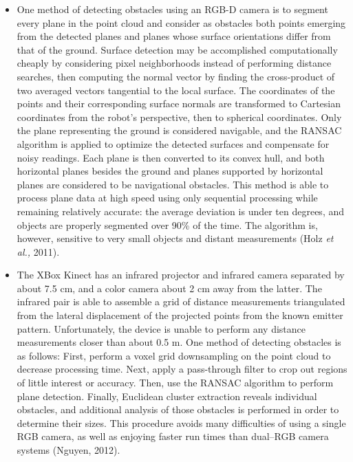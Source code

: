 \documentclass[12pt]{report}
\begin{document}
\begin{itemize}
\item{One method of detecting obstacles using an RGB-D camera is to segment every plane in the point cloud and consider as obstacles both points emerging from the detected planes and planes whose surface orientations differ from that of the ground.  Surface detection may be accomplished computationally cheaply by considering pixel neighborhoods instead of performing distance searches, then computing the normal vector by finding the cross-product of two averaged vectors tangential to the local surface.  The coordinates of the points and their corresponding surface normals are transformed to Cartesian coordinates from the robot's perspective, then to spherical coordinates.  Only the plane representing the ground is considered navigable, and the RANSAC algorithm is applied to optimize the detected surfaces and compensate for noisy readings.  Each plane is then converted to its convex hull, and both horizontal planes besides the ground and planes supported by horizontal planes are considered to be navigational obstacles.  This method is able to process plane data at high speed using only sequential processing while remaining relatively accurate: the average deviation is under ten degrees, and objects are properly segmented over 90\% of the time.  The algorithm is, however, sensitive to very small objects and distant measurements (Holz \textit{et al.,} 2011).}
\item{The XBox Kinect has an infrared projector and infrared camera separated by about 7.5 cm, and a color camera about 2 cm away from the latter.  The infrared pair is able to assemble a grid of distance measurements triangulated from the lateral displacement of the projected points from the known emitter pattern.  Unfortunately, the device is unable to perform any distance measurements closer than about 0.5 m.  One method of detecting obstacles is as follows:  First, perform a voxel grid downsampling on the point cloud to decrease processing time.  Next, apply a pass-through filter to crop out regions of little interest or accuracy.  Then, use the RANSAC algorithm to perform plane detection.  Finally, Euclidean cluster extraction reveals individual obstacles, and additional analysis of those obstacles is performed in order to determine their sizes.  This procedure avoids many difficulties of using a single RGB camera, as well as enjoying faster run times than dual--RGB camera systems (Nguyen, 2012).}

\end{itemize}
\end{document}
